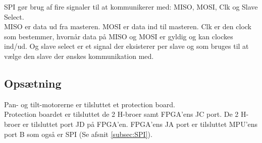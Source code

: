 SPI gør brug af fire signaler til at kommunikerer med: MISO, MOSI, Clk og Slave Select.\\ 
MISO er data ud fra masteren. MOSI er data ind til masteren. Clk er den clock som bestemmer, hvornår data på MISO og MOSI er gyldig og kan clockes ind/ud. Og slave select er et signal der eksisterer per slave og som bruges til at vælge den slave der ønskes kommunikation med.


\subsection{Opsætning}
Pan- og tilt-motorerne er tilsluttet et protection board.\\
Protection boardet er tilsluttet de 2 H-broer samt FPGA'ens JC port.
De 2 H-broer er tilsluttet port JD på FPGA'en.
FPGA'ens JA port er tilsluttet MPU'ens port B som også er SPI (Se afsnit \ref{subsec:SPI}).